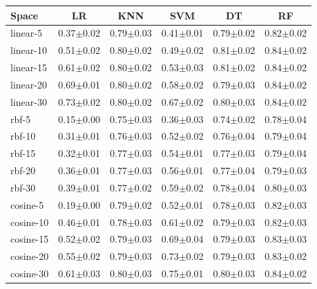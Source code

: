 \begin{tabular}{lccccc}
\toprule
Space & LR & KNN & SVM & DT & RF \\
\midrule
linear-5 & 0.37$\pm$0.02 & 0.79$\pm$0.03 & 0.41$\pm$0.01 & 0.79$\pm$0.02 & 0.82$\pm$0.02 \\
linear-10 & 0.51$\pm$0.02 & 0.80$\pm$0.02 & 0.49$\pm$0.02 & 0.81$\pm$0.02 & 0.84$\pm$0.02 \\
linear-15 & 0.61$\pm$0.02 & 0.80$\pm$0.02 & 0.53$\pm$0.03 & 0.81$\pm$0.02 & 0.84$\pm$0.02 \\
linear-20 & 0.69$\pm$0.01 & 0.80$\pm$0.02 & 0.58$\pm$0.02 & 0.79$\pm$0.03 & 0.84$\pm$0.02 \\
linear-30 & 0.73$\pm$0.02 & 0.80$\pm$0.02 & 0.67$\pm$0.02 & 0.80$\pm$0.03 & 0.84$\pm$0.02 \\
rbf-5 & 0.15$\pm$0.00 & 0.75$\pm$0.03 & 0.36$\pm$0.03 & 0.74$\pm$0.02 & 0.78$\pm$0.04 \\
rbf-10 & 0.31$\pm$0.01 & 0.76$\pm$0.03 & 0.52$\pm$0.02 & 0.76$\pm$0.04 & 0.79$\pm$0.04 \\
rbf-15 & 0.32$\pm$0.01 & 0.77$\pm$0.03 & 0.54$\pm$0.01 & 0.77$\pm$0.03 & 0.79$\pm$0.04 \\
rbf-20 & 0.36$\pm$0.01 & 0.77$\pm$0.03 & 0.56$\pm$0.01 & 0.77$\pm$0.04 & 0.79$\pm$0.03 \\
rbf-30 & 0.39$\pm$0.01 & 0.77$\pm$0.02 & 0.59$\pm$0.02 & 0.78$\pm$0.04 & 0.80$\pm$0.03 \\
cosine-5 & 0.19$\pm$0.00 & 0.79$\pm$0.02 & 0.52$\pm$0.01 & 0.78$\pm$0.03 & 0.82$\pm$0.03 \\
cosine-10 & 0.46$\pm$0.01 & 0.78$\pm$0.03 & 0.61$\pm$0.02 & 0.79$\pm$0.03 & 0.82$\pm$0.03 \\
cosine-15 & 0.52$\pm$0.02 & 0.79$\pm$0.03 & 0.69$\pm$0.04 & 0.79$\pm$0.03 & 0.83$\pm$0.03 \\
cosine-20 & 0.55$\pm$0.02 & 0.79$\pm$0.03 & 0.73$\pm$0.02 & 0.79$\pm$0.03 & 0.83$\pm$0.02 \\
cosine-30 & 0.61$\pm$0.03 & 0.80$\pm$0.03 & 0.75$\pm$0.01 & 0.80$\pm$0.03 & 0.84$\pm$0.02 \\
\bottomrule
\end{tabular}
